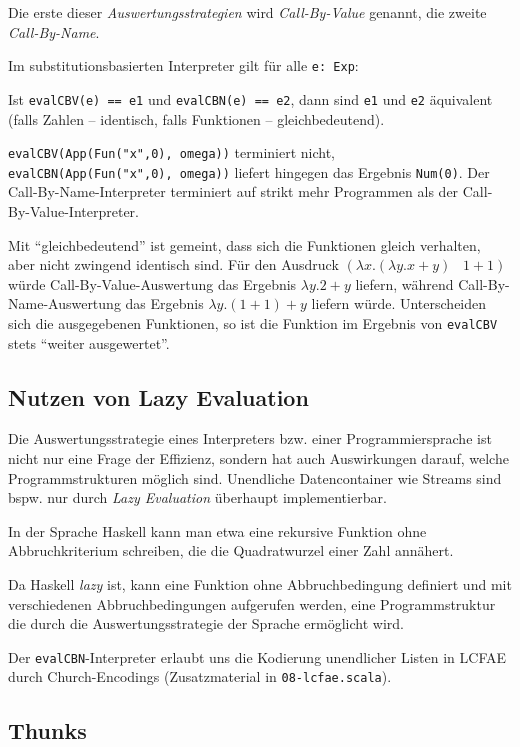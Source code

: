 \documentclass[]{article}
\begin{document}
Die erste dieser \emph{Auswertungsstrategien} wird \emph{Call-By-Value}
genannt, die zweite \emph{Call-By-Name}.

Im substitutionsbasierten Interpreter gilt für alle \texttt{e:\ Exp}:

Ist \texttt{evalCBV(e)\ ==\ e1} und \texttt{evalCBN(e)\ ==\ e2}, dann
sind \texttt{e1} und \texttt{e2} äquivalent (falls Zahlen -- identisch,
falls Funktionen -- gleichbedeutend).

\texttt{evalCBV(App(Fun("x",0),\ omega))} terminiert nicht,
\texttt{evalCBN(App(Fun("x",0),\ omega))} liefert hingegen das Ergebnis
\texttt{Num(0)}. Der Call-By-Name-Interpreter terminiert auf strikt mehr
Programmen als der Call-By-Value-Interpreter.

Mit ``gleichbedeutend'' ist gemeint, dass sich die Funktionen gleich
verhalten, aber nicht zwingend identisch sind. Für den Ausdruck
\((\lambda x.(\lambda y.x+y) \;\;\; 1+1)\) würde
Call-By-Value-Auswertung das Ergebnis \(\lambda y.2+y\) liefern, während
Call-By-Name-Auswertung das Ergebnis \(\lambda y.(1+1)+y\) liefern
würde. Unterscheiden sich die ausgegebenen Funktionen, so ist die
Funktion im Ergebnis von \texttt{evalCBV} stets ``weiter ausgewertet''.

\hypertarget{nutzen-von-lazy-evaluation}{%
\subsection{Nutzen von Lazy
Evaluation}\label{nutzen-von-lazy-evaluation}}

Die Auswertungsstrategie eines Interpreters bzw. einer
Programmiersprache ist nicht nur eine Frage der Effizienz, sondern hat
auch Auswirkungen darauf, welche Programmstrukturen möglich sind.
Unendliche Datencontainer wie Streams sind bspw. nur durch \emph{Lazy
Evaluation} überhaupt implementierbar.

In der Sprache Haskell kann man etwa eine rekursive Funktion ohne
Abbruchkriterium schreiben, die die Quadratwurzel einer Zahl annähert.

Da Haskell \emph{lazy} ist, kann eine Funktion ohne Abbruchbedingung
definiert und mit verschiedenen Abbruchbedingungen aufgerufen werden,
eine Programmstruktur die durch die Auswertungsstrategie der Sprache
ermöglicht wird.

Der \texttt{evalCBN}-Interpreter erlaubt uns die Kodierung unendlicher
Listen in LCFAE durch Church-Encodings (Zusatzmaterial in
\texttt{08-lcfae.scala}).

\hypertarget{thunks}{%
\subsection{Thunks}\label{thunks}}
\end{document}
